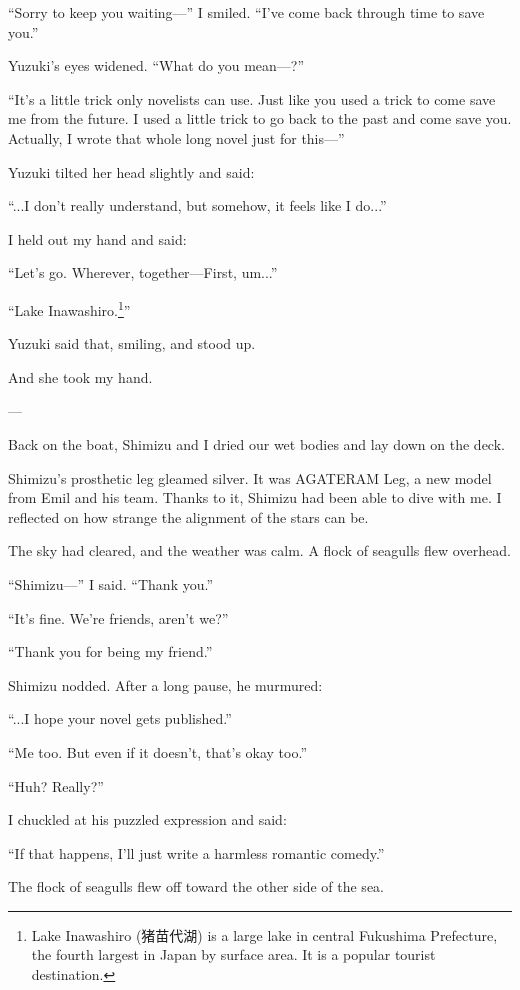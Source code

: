 \documentclass[
    a4paper,
    12pt,
    twoside,
    openany,
    UTF8,
    fontset=windows
]{ctexbook}
\begin{document}
``Sorry to keep you waiting---'' I smiled. ``I've come back through time to save you.''

Yuzuki's eyes widened. ``What do you mean---?''

``It's a little trick only novelists can use. Just like you used a trick to come save me from the future. I used a little trick to go back to the past and come save you. Actually, I wrote that whole long novel just for this---''

Yuzuki tilted her head slightly and said:

``...I don't really understand, but somehow, it feels like I do...''

I held out my hand and said:

``Let's go. Wherever, together---First, um...''

``Lake Inawashiro.\footnote{Lake Inawashiro (猪苗代湖) is a large lake in central Fukushima Prefecture, the fourth largest in Japan by surface area. It is a popular tourist destination.}''

Yuzuki said that, smiling, and stood up.

And she took my hand.

---

Back on the boat, Shimizu and I dried our wet bodies and lay down on the deck.

Shimizu's prosthetic leg gleamed silver. It was AGATERAM Leg, a new model from Emil and his team. Thanks to it, Shimizu had been able to dive with me. I reflected on how strange the alignment of the stars can be.

The sky had cleared, and the weather was calm. A flock of seagulls flew overhead.

``Shimizu---'' I said. ``Thank you.''

``It's fine. We're friends, aren't we?''

``Thank you for being my friend.''

Shimizu nodded. After a long pause, he murmured:

``...I hope your novel gets published.''

``Me too. But even if it doesn't, that's okay too.''

``Huh? Really?''

I chuckled at his puzzled expression and said:

``If that happens, I'll just write a harmless romantic comedy.''

The flock of seagulls flew off toward the other side of the sea.
\end{document}
